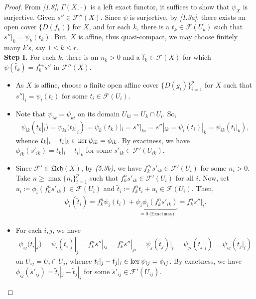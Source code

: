 \documentclass[11pt,a4paper,footinclude=true,headinclude=true]{scrbook} %
\let\Im\relax
\DeclareMathOperator{\Im}{Im}
\newcommand{\FF}{\mathscr{F}}
\newcommand{\<}{\langle}
\newcommand{\>}{\rangle}
\newcommand{\qcoh}{\mathfrak{Qch}}
\begin{document}
\begin{proof}
    From \textit{[1.8]}, $\Gamma(X,\cdot)$ is a left exact functor, it suffices to show that $\psi_X$ is surjective. Given $s''\in\FF''(X)$. Since $\psi$ is surjective, by \textit{[1.3a]}, there exists an open cover $\{D(f_k)\}$ for $X$, and for each $k$, there is a $t_k\in\FF(U_k)$ such that $s''|_k=\psi_k(t_k)$. But, $X$ is affine, thus quasi-compact, we may choose finitely many $k$'s, say $1\leq k\leq r$.\\ \newline
    \textbf{Step I.} For each $k$, there is an $n_k>0$ and a $\hat{t}_k\in\FF(X)$ for which $\psi(\hat{t}_k)=f^{n_k}_ks''$ in $\FF''(X)$.
    \begin{itemize}
        \item[(i)] As $X$ is affine, choose a finite open affine cover $\{D(g_i)\}_{i=1}^p$ for $X$ such that $s''|_i=\psi_i(t_i)$ for some $t_i\in\FF(U_i)$.
        \item[(ii)] Note that $\psi_{ik}=\psi_{ki}$ on its domain $U_{ki}=U_k\cap U_i$. So,
        \begin{align*}
            \psi_{ik}(t_k|_i)=\psi_{ki}(t_k|_i)=\psi_k(t_k)|_i=s''|_{ki}=s''|_{ik}=\psi_i(t_i)|_k=\psi_{ik}(t_i|_k),
        \end{align*}
        whence $t_k|_i-t_i|_k\in\ker\psi_{ik}=\Im\phi_{ik}$. By exactness, we have $\phi_{ik}(s'_{ik})=t_k|_i-t_i|_k$ for some $s'_{ik}\in\FF'(U_{ik})$.
        \item[(iii)] Since $\FF'\in\qcoh(X)$, by \textit{(5.3b)}, we have $f^{n_i}_ks'_{ik}\in\FF'(U_i)$ for some $n_i>0$. Take $n\geq\max\{n_i\}_{i=1}^p$ such that $f^n_ks'_{ik}\in\FF'(U_i)$ for all $i$. Now, set $u_i\coloneqq\phi_i(f^n_ks'_{ik})\in\FF(U_i)$ and $\tilde{t}_i\coloneqq f^n_kt_i+u_i\in\FF(U_i)$. Then, 
        \begin{align*}
            \psi_i(\tilde{t}_i)=f^n_k\psi_i(t_i)+\underbrace{\psi_i\phi_i(f^n_ks'_{ik})}_{=0\ \text{(Exactness)}}=f^n_ks''|_i.
        \end{align*}
        \item[(iv)] For each $i,j$, we have
        \begin{align*}
            \psi_{ij}(\tilde{t}_i|_j)=\psi_i(\tilde{t}_i)|_j=f^n_ks''|_{ij}=f^n_ks''|_{ji}=\psi_j(\tilde{t}_j)|_i=\psi_{ji}(\tilde{t}_j|_i)=\psi_{ij}(\tilde{t}_j|_i)
        \end{align*}
        on $U_{ij}=U_i\cap U_j$, whence $\tilde{t}_i|_j-\tilde{t}_j|_i\in\ker\psi_{ij}=\Im\phi_{ij}$. By exactness, we have $\phi_{ij}(\tilde{s}'_{ij})=\tilde{t}_i|_j-\tilde{t}_j|_i$ for some $\tilde{s}'_{ij}\in\FF'(U_{ij})$.

\end{itemize}
\end{proof}
\end{document}
